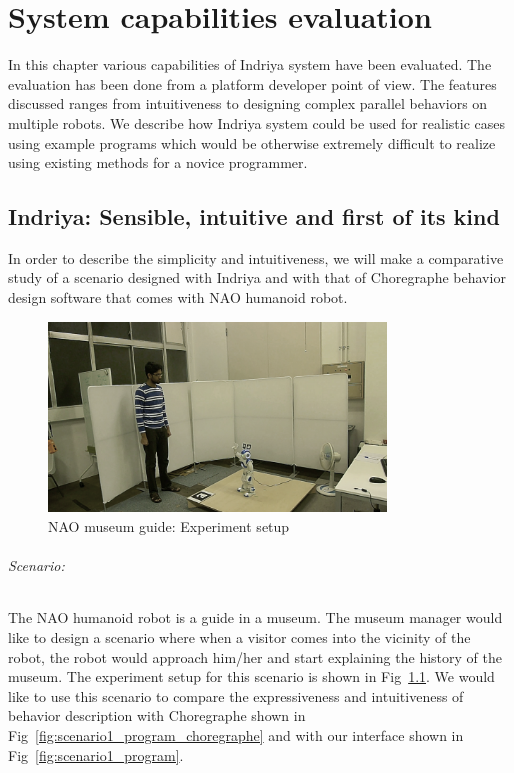 
\chapter{System capabilities evaluation} %

\label{Chapter5} %


In this chapter various capabilities of Indriya system have been evaluated. The evaluation has been done from a platform developer point of view. The features discussed ranges from intuitiveness to designing complex parallel behaviors on multiple robots. We describe how Indriya system could be used for realistic cases using example programs which would be otherwise extremely difficult to realize using existing methods for a novice programmer.
\section{Indriya: Sensible, intuitive and first of its kind}
In order to describe the simplicity and intuitiveness, we will make a comparative study of a scenario designed with Indriya and with that of Choregraphe behavior design software that comes with NAO humanoid robot. 
\begin{figure}[H]
\centering
\includegraphics[width=0.8\textwidth]{../thesis/assets/scenario_museum.png}
\caption[NAO museum guide: Experiment setup]{NAO museum guide: Experiment setup}
\label{fig:scenario1_setup}
\end{figure}

\subparagraph{Scenario:} The NAO humanoid robot is a guide in a museum. The museum manager would like to design a scenario where when a visitor comes into the vicinity of the robot, the robot would approach him/her and start explaining the history of the museum. The experiment setup for this scenario is shown in Fig~\ref{fig:scenario1_setup}. We would like to use this scenario to compare the expressiveness and intuitiveness of behavior description with Choregraphe \cite{NaoRobot} shown in Fig~\ref{fig:scenario1_program_choregraphe} and with our interface shown in Fig~\ref{fig:scenario1_program}.


